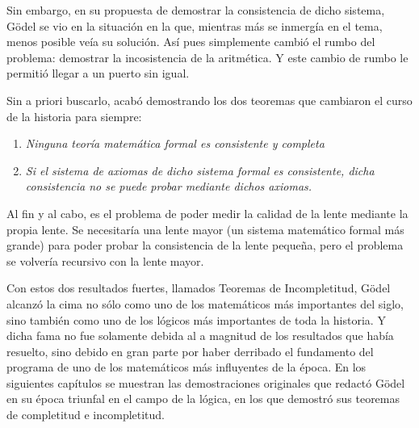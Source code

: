 Sin embargo, en su propuesta de demostrar la consistencia de dicho sistema, Gödel se vio en la situación en la que, mientras más se inmergía en el tema, menos posible veía su solución. 
Así pues simplemente cambió el rumbo del problema: demostrar la incosistencia de la aritmética. Y este cambio de rumbo le permitió llegar a un puerto sin igual.

Sin a priori buscarlo, acabó demostrando los dos teoremas que cambiaron el curso de la historia para siempre:

\begin{center}
    \begin{enumerate}
        \item \textit{Ninguna teoría matemática formal es consistente y completa}
        \item \textit{Si el sistema de axiomas de dicho sistema formal es consistente, dicha consistencia no se puede probar mediante dichos axiomas.}
    \end{enumerate}
\end{center}

Al fin y al cabo, es el problema de poder medir la calidad de la lente mediante la propia lente. Se necesitaría una lente mayor (un sistema matemático formal más grande) para poder probar
la consistencia de la lente pequeña, pero el problema se volvería recursivo con la lente mayor.

Con estos dos resultados fuertes, llamados Teoremas de Incompletitud, Gödel alcanzó la cima no sólo como uno de los matemáticos más importantes del siglo, sino también como uno de los 
lógicos más importantes de toda la historia. Y dicha fama no fue solamente debida al a magnitud de los resultados que había resuelto, sino debido en gran parte por haber derribado el fundamento
del programa de uno de los matemáticos más influyentes de la época. En los siguientes capítulos se muestran las demostraciones originales que redactó Gödel en su época triunfal en el campo de la lógica,
en los que demostró sus teoremas de completitud e incompletitud.






\endinput
